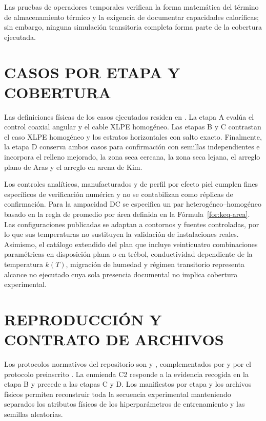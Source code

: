 Las pruebas de operadores temporales verifican la forma matemática del término de almacenamiento térmico y la exigencia de documentar capacidades caloríficas; sin embargo, ninguna simulación transitoria completa forma parte de la cobertura ejecutada.

\section{CASOS POR ETAPA Y COBERTURA}
\label{anx:catalogo-casos}

Las definiciones físicas de los casos ejecutados residen en . La etapa A evalúa el control coaxial angular y el cable XLPE homogéneo. Las etapas B y C contrastan el caso XLPE homogéneo y los estratos horizontales con salto exacto. Finalmente, la etapa D conserva ambos casos para confirmación con semillas independientes e incorpora el relleno mejorado, la zona seca cercana, la zona seca lejana, el arreglo plano de Aras y el arreglo en arena de Kim.

Los controles analíticos, manufacturados y de perfil por efecto piel cumplen fines específicos de verificación numérica y no se contabilizan como réplicas de confirmación. Para la ampacidad DC se especifica un par heterogéneo--homogéneo basado en la regla de promedio por área definida en la Fórmula~\ref{for:keq-area}. Las configuraciones publicadas se adaptan a contornos y fuentes controladas, por lo que sus temperaturas no sustituyen la validación de instalaciones reales. Asimismo, el catálogo extendido del plan que incluye veinticuatro combinaciones paramétricas en disposición plana o en trébol, conductividad dependiente de la temperatura $k(T)$, migración de humedad y régimen transitorio representa alcance no ejecutado cuya sola presencia documental no implica cobertura experimental.

\section{REPRODUCCIÓN Y CONTRATO DE ARCHIVOS}
\label{anx:protocolo-reproduccion}

Los protocolos normativos del repositorio son  y , complementados por  y por el protocolo preinscrito . La enmienda C2 responde a la evidencia recogida en la etapa B y precede a las etapas C y D. Los manifiestos por etapa y los archivos físicos permiten reconstruir toda la secuencia experimental manteniendo separados los atributos físicos de los hiperparámetros de entrenamiento y las semillas aleatorias.

